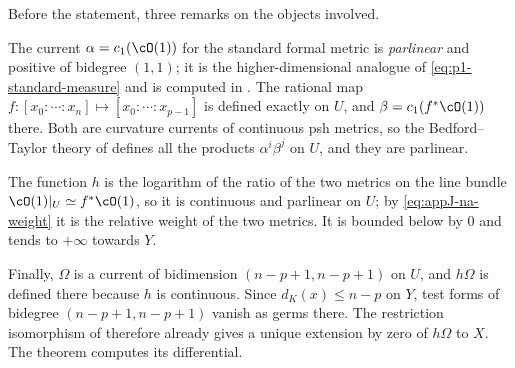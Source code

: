 Before the statement, three remarks on the objects involved.

The current $\alpha=c_1(\cO(1))$ for the standard formal metric is
\emph{parlinear} and positive of bidegree $(1,1)$; it is the higher-dimensional
analogue of \eqref{eq:p1-standard-measure} and is computed in
.  The rational map
$f:[x_0:\cdots:x_n]\mapsto[x_0:\cdots:x_{p-1}]$ is defined exactly on $U$,
and $\beta=c_1(f^*\cO(1))$ there.  Both are curvature currents of continuous
psh metrics, so the Bedford--Taylor theory of
 defines all the products $\alpha^i\beta^j$ on
$U$, and they are parlinear.

The function $h$ is the logarithm of the ratio of the two metrics on the line
bundle $\cO(1)|_U\simeq f^*\cO(1)$, so it is continuous and parlinear on $U$;
by \eqref{eq:appJ-na-weight} it is the relative weight of the two metrics.
It is bounded below by $0$ and tends to $+\infty$ towards $Y$.

Finally, $\Omega$ is a current of bidimension $(n-p+1,n-p+1)$ on $U$, and
$h\Omega$ is defined there because $h$ is continuous.  Since $d_K(x)\le n-p$ on $Y$, test forms of bidegree
$(n-p+1,n-p+1)$ vanish as germs there.  The restriction isomorphism of
\cite[Lemma~7.1.13]{CLD25} therefore already gives a unique extension by
zero of $h\Omega$ to $X$.  The theorem computes its differential.


